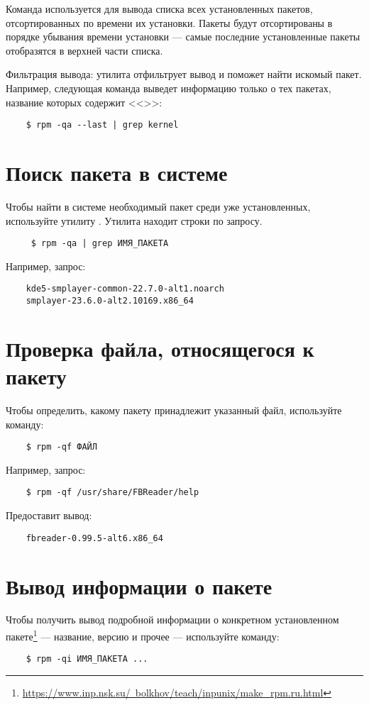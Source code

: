 Команда  используется для вывода списка всех установленных пакетов, отсортированных
по времени их установки. Пакеты будут отсортированы в порядке убывания времени установки --- самые
последние установленные пакеты отобразятся в верхней части списка.

Фильтрация вывода: утилита  отфильтрует вывод и поможет найти искомый пакет. Например,
следующая команда выведет информацию только о тех пакетах, название которых содержит <<>>:

\begin{verbatim}
    $ rpm -qa --last | grep kernel
\end{verbatim}

\section{Поиск пакета в системе}
Чтобы найти в системе необходимый пакет среди уже установленных, используйте утилиту . Утилита  находит строки по запросу.
\begin{verbatim}
     $ rpm -qa | grep ИМЯ_ПАКЕТА
\end{verbatim}

Например, запрос:
\begin{verbatim}
    kde5-smplayer-common-22.7.0-alt1.noarch
    smplayer-23.6.0-alt2.10169.x86_64
\end{verbatim}

\section{Проверка файла, относящегося к пакету}
Чтобы определить, какому пакету принадлежит указанный файл, используйте команду:
\begin{verbatim}
    $ rpm -qf ФАЙЛ
\end{verbatim}

Например, запрос:
\begin{verbatim}
    $ rpm -qf /usr/share/FBReader/help
\end{verbatim}
Предоставит вывод:
\begin{verbatim}
    fbreader-0.99.5-alt6.x86_64
\end{verbatim}

\section{Вывод информации о пакете}
Чтобы получить вывод подробной информации о конкретном установленном пакете\footnote{\href{https://www.inp.nsk.su/~bolkhov/teach/inpunix/make_rpm.ru.html}{https://www.inp.nsk.su/~bolkhov/teach/inpunix/make\_rpm.ru.html}} --- название, версию и прочее --- используйте команду:
\begin{verbatim}
    $ rpm -qi ИМЯ_ПАКЕТА ...
\end{verbatim}


